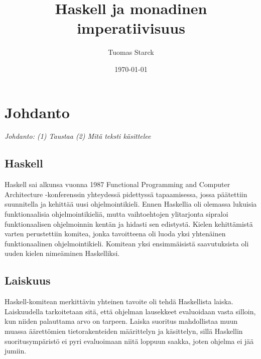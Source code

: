 \documentclass[finnish]{tktltiki2}
\title{Haskell ja monadinen imperatiivisuus}
\author{Tuomas Starck}
\date{\today}
\begin{document}
\frontmatter

\maketitle
\makeabstract

\tableofcontents

\mainmatter

\newcommand{\arr}[0]{\rightarrow}
\newcommand{\code}[1]{\texttt{#1}}
\newcommand{\fixme}[1]{\emph{#1}}


\section{Johdanto}


\fixme{Johdanto: (1) Taustaa (2) Mitä teksti käsittelee}

\subsection{Haskell}

Haskell sai alkunsa vuonna 1987 Functional Programming and Computer Architecture -konferenssin
yhteydessä pidettyssä tapaamisessa, jossa päätettiin suunnitella ja kehittää uusi ohjelmointikieli.
Ennen Haskellia oli olemassa lukuisia funktionaalisia ohjelmointikieliä, mutta vaihtoehtojen
ylitarjonta sipraloi funktionaalisen ohjelmoinnin kentän ja hidasti sen edistystä. Kielen
kehittämistä varten perustettiin komitea, jonka tavoitteena oli luoda yksi yhtenäinen
funktionaalinen ohjelmointikieli. Komitean yksi ensimmäisistä saavutuksista oli uuden kielen
nimeäminen Haskelliksi.

\subsection{Laiskuus}
\label{subsec:laiskuus}

Haskell-komitean merkittävin yhteinen tavoite oli tehdä Haskellista laiska. Laiskuudella
tarkoitetaan sitä, että ohjelman lausekkeet evaluoidaan vasta silloin, kun niiden palauttama arvo on
tarpeen. Laiska suoritus mahdollistaa muun muassa äärettömien tietorakenteiden määrittelyn ja
käsittelyn, sillä Haskellin suoritusympäristö ei pyri evaluoimaan niitä loppuun saakka, joten
ohjelma ei jää jumiin.
\end{document}

